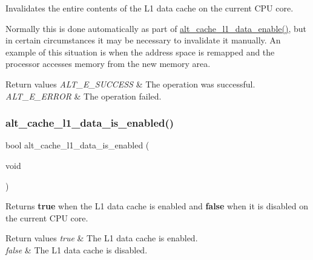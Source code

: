 Invalidates the entire contents of the L1 data cache on the current C\+PU core.

Normally this is done automatically as part of \mbox{\hyperlink{group__CACHE__L1_ga7cf879a94e789a076a0ba1f8b53ba24c}{alt\+\_\+cache\+\_\+l1\+\_\+data\+\_\+enable()}}, but in certain circumstances it may be necessary to invalidate it manually. An example of this situation is when the address space is remapped and the processor accesses memory from the new memory area.


\begin{DoxyRetVals}{Return values}
{\em A\+L\+T\+\_\+\+E\+\_\+\+S\+U\+C\+C\+E\+SS} & The operation was successful. \\
\hline
{\em A\+L\+T\+\_\+\+E\+\_\+\+E\+R\+R\+OR} & The operation failed. \\
\hline
\end{DoxyRetVals}
\mbox{\label{group__CACHE__L1_ga1b8079ba3d6940005661269af5a04113}} 
\subsubsection{\texorpdfstring{alt\_cache\_l1\_data\_is\_enabled()}{alt\_cache\_l1\_data\_is\_enabled()}}
{\footnotesize\ttfamily bool alt\+\_\+cache\+\_\+l1\+\_\+data\+\_\+is\+\_\+enabled (\begin{DoxyParamCaption}\item[{void}]{ }\end{DoxyParamCaption})}

Returns {\bfseries{true}} when the L1 data cache is enabled and {\bfseries{false}} when it is disabled on the current C\+PU core.


\begin{DoxyRetVals}{Return values}
{\em true} & The L1 data cache is enabled. \\
\hline
{\em false} & The L1 data cache is disabled. \\
\hline
\end{DoxyRetVals}
\mbox{\label{group__CACHE__L1_gae17913c31c50609b13379653e920152f}} 
